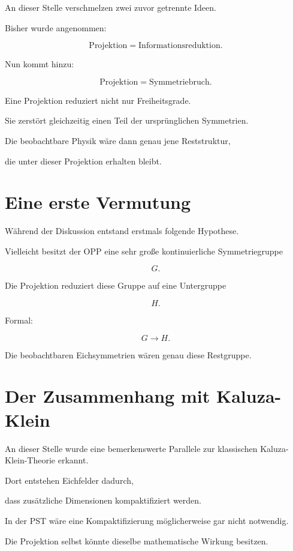 \begin{itemize}
An dieser Stelle verschmelzen zwei zuvor getrennte Ideen.

Bisher wurde angenommen:

\[
\text{Projektion}
=
\text{Informationsreduktion}.
\]

Nun kommt hinzu:

\[
\boxed{
\text{Projektion}
=
\text{Symmetriebruch}.
}
\]

Eine Projektion reduziert nicht nur Freiheitsgrade.

Sie zerstört gleichzeitig einen Teil der ursprünglichen Symmetrien.

Die beobachtbare Physik wäre dann genau jene Reststruktur,

die unter dieser Projektion erhalten bleibt.


\section*{Eine erste Vermutung}

Während der Diskussion entstand erstmals folgende Hypothese.

Vielleicht besitzt der OPP eine sehr große kontinuierliche Symmetriegruppe

\[
G.
\]

Die Projektion reduziert diese Gruppe auf eine Untergruppe

\[
H.
\]

Formal:

\[
\boxed{
G
\longrightarrow
H.
}
\]

Die beobachtbaren Eichsymmetrien wären genau diese Restgruppe.


\section*{Der Zusammenhang mit Kaluza-Klein}

An dieser Stelle wurde eine bemerkenswerte Parallele zur klassischen Kaluza-Klein-Theorie erkannt.

Dort entstehen Eichfelder dadurch,

dass zusätzliche Dimensionen kompaktifiziert werden.

In der PST wäre eine Kompaktifizierung möglicherweise gar nicht notwendig.

Die Projektion selbst könnte dieselbe mathematische Wirkung besitzen.


\end{itemize}
